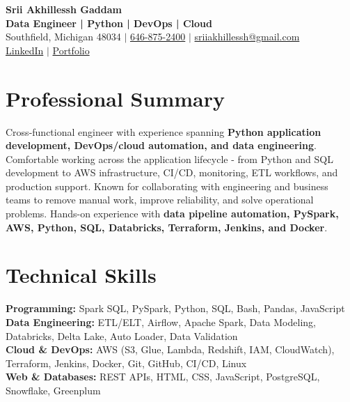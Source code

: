 \documentclass[letterpaper,10pt]{article}
\begin{document}
\fontsize{9.35pt}{10.45pt}\selectfont

\begin{center}
    {\LARGE \textbf{Srii Akhillessh Gaddam}} \\[-1pt]
    \textbf{Data Engineer | Python | DevOps | Cloud} \\[2pt]
    Southfield, Michigan 48034 $|$
    \href{tel:6468752400}{646-875-2400} $|$
    \href{mailto:sriiakhillessh@gmail.com}{sriiakhillessh@gmail.com} \\[1pt]
    \href{https://www.linkedin.com/in/srii-akhiilessh-gaddam-b48668191/}{LinkedIn} $|$
    \href{https://sriiakhillesshg.github.io/portfolio/}{Portfolio}
\end{center}
\vspace{-8pt}

\section{Professional Summary}
\small{Cross-functional engineer with experience spanning \textbf{Python application development, DevOps/cloud automation, and data engineering}. Comfortable working across the application lifecycle - from Python and SQL development to AWS infrastructure, CI/CD, monitoring, ETL workflows, and production support. Known for collaborating with engineering and business teams to remove manual work, improve reliability, and solve operational problems. Hands-on experience with \textbf{data pipeline automation, PySpark, AWS, Python, SQL, Databricks, Terraform, Jenkins, and Docker}.}

\section{Technical Skills}
\small{
\textbf{Programming:} Spark SQL, PySpark, Python, SQL, Bash, Pandas, JavaScript \\
\textbf{Data Engineering:} ETL/ELT, Airflow, Apache Spark, Data Modeling, Databricks, Delta Lake, Auto Loader, Data Validation \\
\textbf{Cloud \& DevOps:} AWS (S3, Glue, Lambda, Redshift, IAM, CloudWatch), Terraform, Jenkins, Docker, Git, GitHub, CI/CD, Linux \\
\textbf{Web \& Databases:} REST APIs, HTML, CSS, JavaScript, PostgreSQL, Snowflake, Greenplum
}

\end{document}
